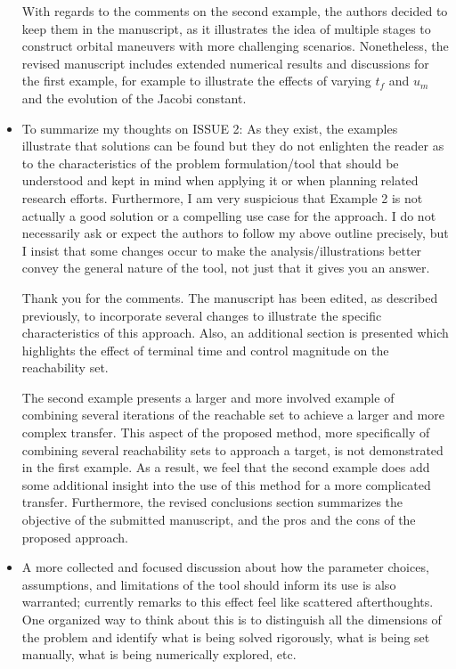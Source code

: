 \documentclass[11pt]{article}
\begin{document}
\begin{itemize}
		With regards to the comments on the second example, the authors decided to keep them in the manuscript, as it illustrates the idea of multiple stages to construct orbital maneuvers with more challenging scenarios. 
		Nonetheless, the revised manuscript includes extended numerical results and discussions for the first example, for example to illustrate the effects of varying $t_f$ and $u_m$ and the evolution of the Jacobi constant. 
    \item 
        \begin{itshape}
            To summarize my thoughts on ISSUE 2:
            As they exist, the examples illustrate that solutions can be found but they do not enlighten the reader as to the characteristics of the problem formulation/tool that should be understood and kept in mind when applying it or when planning related research efforts.  Furthermore, I am very suspicious that Example 2 is not actually a good solution or a compelling use case for the approach.  I do not necessarily ask or expect the authors to follow my above outline precisely, but I insist that some changes occur to make the analysis/illustrations better convey the general nature of the tool, not just that it gives you an answer.  
        \end{itshape}
    
        Thank you for the comments.
        The manuscript has been edited, as described previously, to incorporate several changes to illustrate the specific characteristics of this approach.
        Also, an additional section is presented which highlights the effect of terminal time and control magnitude on the reachability set. 

        The second example presents a larger and more involved example of combining several iterations of the reachable set to achieve a larger and more complex transfer. 
        This aspect of the proposed method, more specifically of combining several reachability sets to approach a target, is not demonstrated in the first example.
        As a result, we feel that the second example does add some additional insight into the use of this method for a more complicated transfer.
		Furthermore, the revised conclusions section summarizes the objective of the submitted manuscript, and the pros and the cons of the proposed approach. 

    \item
        \begin{itshape}
            A more collected and focused discussion about how the parameter choices, assumptions, and limitations of the tool should inform its use is also warranted; currently remarks to this effect feel like scattered afterthoughts.  One organized way to think about this is to distinguish all the dimensions of the problem and identify what is being solved rigorously, what is being set manually, what is being numerically explored, etc.
        \end{itshape}


\end{itemize}
\end{document}
